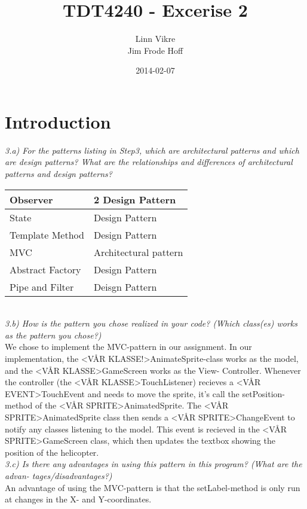 \documentclass[]{article}
\title{TDT4240 - Excerise 2}
\author{Linn Vikre\\ Jim Frode Hoff}
\date{2014-02-07}
\begin{document}
\ifpdf
{}
\else
{}
\fi

\maketitle

\section{Introduction}
\emph{3.a) For the patterns listing in Step3, which are architectural patterns 
and which are design patterns? What are the relationships and differences of 
architectural patterns and design patterns?}
\\

\begin{tabular}{ | l | l | } \hline
  Observer & 2 Design Pattern \\ \hline
  State & Design Pattern \\ \hline
  Template Method & Design Pattern \\ \hline
  MVC & Architectural pattern \\ \hline
  Abstract Factory & Design Pattern \\ \hline
  Pipe and Filter & Deisgn Pattern \\ \hline
\end{tabular}
\\

\emph{3.b) How is the pattern you chose realized in your code? (Which class(es)
 works as the pattern you chose?)}
\\
We chose to implement the MVC-pattern in our assignment. In our implementation, 
the <VÅR KLASSE!>AnimateSprite-class works as the model, and the <VÅR KLASSE>GameScreen 
works as the View- Controller. Whenever the controller (the <VÅR KLASSE>TouchListener) 
recieves a <VÅR EVENT>TouchEvent and needs to move the sprite, it’s call the 
setPosition-method of the <VÅR SPRITE>AnimatedSprite. The <VÅR SPRITE>AnimatedSprite 
class then sends a <VÅR SPRITE>ChangeEvent to notify any classes listening to the model. 
This event is recieved in the <VÅR SPRITE>GameScreen class, which then updates the 
textbox showing the position of the helicopter.\\

\emph{3.c) Is there any advantages in using this pattern in this program? (What are the advan- tages/disadvantages?)}\\
An advantage of using the MVC-pattern is that the setLabel-method is only run at changes in the X- and Y-coordinates.






\end{document}
